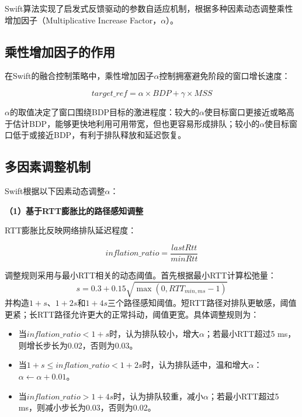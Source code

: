 Swift算法实现了启发式反馈驱动的参数自适应机制，根据多种因素动态调整乘性增加因子（Multiplicative Increase Factor，$\alpha$）。

\subsection{乘性增加因子的作用}

在Swift的融合控制策略中，乘性增加因子$\alpha$控制拥塞避免阶段的窗口增长速度：

\begin{equation}
target\_ref = \alpha \times BDP + \gamma \times MSS
\end{equation}

$\alpha$的取值决定了窗口围绕BDP目标的激进程度：较大的$\alpha$使目标窗口更接近或略高于估计BDP，能够更快地利用可用带宽，但也更容易形成排队；较小的$\alpha$使目标窗口低于或接近BDP，有利于排队释放和延迟恢复。

\subsection{多因素调整机制}

Swift根据以下因素动态调整$\alpha$：

\textbf{（1）基于RTT膨胀比的路径感知调整}

RTT膨胀比反映网络排队延迟程度：

\begin{equation}
inflation\_ratio = \frac{lastRtt}{minRtt}
\end{equation}

调整规则采用与最小RTT相关的动态阈值。首先根据最小RTT计算松弛量：
\begin{equation}
s = 0.3 + 0.15\sqrt{\max(0, RTT_{min,ms}-1)}
\end{equation}
并构造$1+s$、$1+2s$和$1+4s$三个路径感知阈值。短RTT路径对排队更敏感，阈值更紧；长RTT路径允许更大的正常抖动，阈值更宽。具体调整规则为：
\begin{itemize}
    \item 当$inflation\_ratio < 1+s$时，认为排队较小，增大$\alpha$；若最小RTT超过5 ms，则增长步长为0.02，否则为0.03。
    \item 当$1+s \leq inflation\_ratio < 1+2s$时，认为排队适中，温和增大$\alpha$：$\alpha \leftarrow \alpha + 0.01$。
    \item 当$inflation\_ratio > 1+4s$时，认为排队较重，减小$\alpha$；若最小RTT超过5 ms，则减小步长为0.03，否则为0.02。
\end{itemize}

